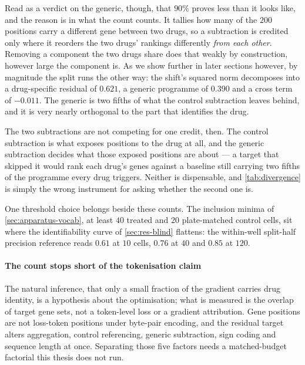   Read as a verdict on the generic, though, that $90\%$ proves less than it looks
  like, and the reason is in what the count counts. It tallies how many of the $200$
  positions carry a different gene between two drugs, so a subtraction is credited
  only where it reorders the two drugs' rankings differently \emph{from each other}.
  Removing a component the two drugs share does that weakly by construction, however
  large the component is. As we show further in later sections however, by magnitude the split runs the other way: the shift's
  squared norm decomposes into a drug-specific residual of $0.621$, a generic
  programme of $0.390$ and a cross term of $-0.011$. The generic is two fifths of
  what the control subtraction leaves behind, and it is very nearly orthogonal to
  the part that identifies the drug.
  
  The two subtractions are not competing for one credit, then. The control
  subtraction is what exposes positions to the drug at all, and the generic
  subtraction decides what those exposed positions are about --- a target that
  skipped it would rank each drug's genes against a baseline still carrying two
  fifths of the programme every drug triggers. Neither is dispensable, and
  \cref{tab:divergence} is simply the wrong instrument for asking whether the second
  one is.
  
  One threshold choice belongs beside these counts. The inclusion minima of
  \cref{sec:apparatus-vocab}, at least $40$ treated and $20$ plate-matched control
  cells, sit where the identifiability curve of \cref{sec:res-blind} flattens: the
  within-well split-half precision reference reads $0.61$ at $10$ cells, $0.76$ at
  $40$ and $0.85$ at $120$.
  
  \paragraph{The count stops short of the tokenisation claim} The natural inference,
  that only a small fraction of the gradient carries drug identity, is a hypothesis
  about the optimisation; what is measured is the overlap of target gene sets, not a
  token-level loss or a gradient attribution. Gene positions are not loss-token
  positions under byte-pair encoding, and the residual target alters aggregation,
  control referencing, generic subtraction, sign coding and sequence length at once.
  Separating those five factors needs a matched-budget factorial this thesis does not
  run.
  
  
